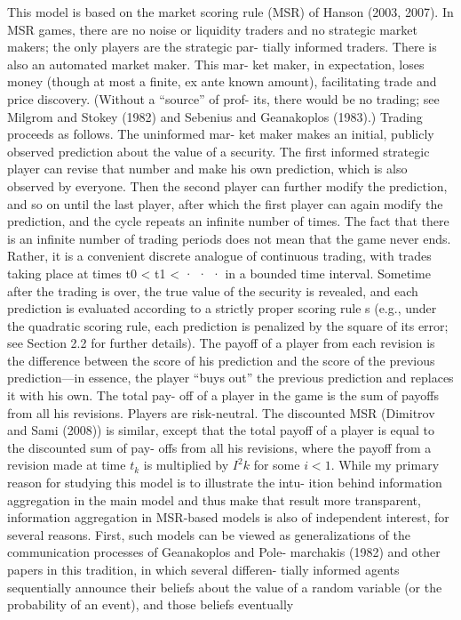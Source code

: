 {This model is based on the market scoring rule (MSR) of Hanson (2003, 2007). In MSR games, there are no noise or liquidity traders and no strategic market makers; the only players are the strategic par- tially informed traders. There is also an automated market maker. This mar- ket maker, in expectation, loses money (though at most a finite, ex ante known amount), facilitating trade and price discovery. (Without a “source” of prof- its, there would be no trading; see Milgrom and Stokey (1982) and Sebenius and Geanakoplos (1983).) Trading proceeds as follows. The uninformed mar- ket maker makes an initial, publicly observed prediction about the value of a security. The first informed strategic player can revise that number and make his own prediction, which is also observed by everyone. Then the second player can further modify the prediction, and so on until the last player, after which the first player can again modify the prediction, and the cycle repeats an infinite number of times. The fact that there is an infinite number of trading periods does not mean that the game never ends. Rather, it is a convenient discrete analogue of continuous trading, with trades taking place at times t0 < t1 < · · · in a bounded time interval. Sometime after the trading is over, the true value of the security is revealed, and each prediction is evaluated according to a strictly proper scoring rule s (e.g., under the quadratic scoring rule, each prediction is penalized by the square of its error; see Section 2.2 for further details). The payoff of a player from each revision is the difference between the score of his prediction and the score of the previous prediction—in essence, the player “buys out” the previous prediction and replaces it with his own. The total pay- off of a player in the game is the sum of payoffs from all his revisions. Players are risk-neutral. The discounted MSR (Dimitrov and Sami (2008)) is similar, except that the total payoff of a player is equal to the discounted sum of pay- offs from all his revisions, where the payoff from a revision made at time $t_k$ is multiplied by $I^2k$ for some $ i< 1$.
While my primary reason for studying this model is to illustrate the intu- ition behind information aggregation in the main model and thus make that result more transparent, information aggregation in MSR-based models is also of independent interest, for several reasons. First, such models can be viewed as generalizations of the communication processes of Geanakoplos and Pole- marchakis (1982) and other papers in this tradition, in which several differen- tially informed agents sequentially announce their beliefs about the value of a random variable (or the probability of an event), and those beliefs eventually
}
